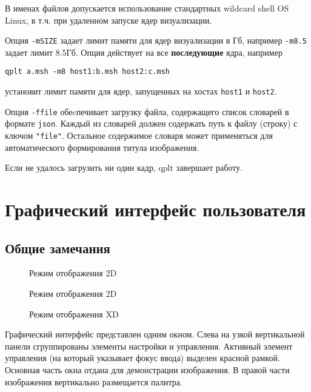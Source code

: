 \documentclass[12pt]{article}
\begin{document}
В именах файлов допускается использование стандартных wildcard shell OS Linux, в т.ч. при удаленном запуске ядер визуализации.

Опция \verb'-mSIZE' задает лимит памяти для ядер визуализации в Гб, например \verb'-m8.5' задает лимит 8.5Гб. Опция действует на все
{\bf последующие} ядра, например
\begin{verbatim}
qplt a.msh -m8 host1:b.msh host2:c.msh
\end{verbatim}
установит лимит памяти для ядер, запущенных на хостах \verb'host1' и \verb'host2'.

Опция  \verb'-ffile' обеcпечивает загрузку файла, содержащего список словарей в формате \verb'json'.
Каждый из словарей должен содержать путь к файлу (строку) с ключом \verb'"file"'.
Остальное содержимое словаря может применяться для автоматического формирования титула изображения.

Если не удалось загрузить ни один кадр, qplt завершает работу.

\section{Графический интерфейс пользователя}
\subsection{Общие замечания}
\begin{figure}[hb]
  \begin{center}
  \end{center}
  \caption{Режим отображения 2D}\label{2D:pict}
\end{figure}

\begin{figure}
  \begin{center}
  \end{center}
  \caption{Режим отображения 2D}\label{3D:pict}
  \begin{center}
  \end{center}
  \caption{Режим отображения XD}\label{XD:pict}
\end{figure}
Графический интерфейс представлен одним окном. Слева на узкой вертикальной панели сгруппированы элементы настройки и управления.
Активный элемент управления (на который указывает фокус ввода) выделен красной рамкой.
Основная часть окна отдана для демонстрации изображения. В правой части изображения вертикально размещается палитра. 
\end{document}
